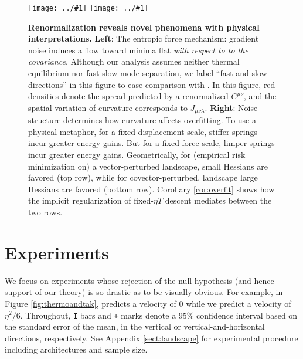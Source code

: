 \documentclass{article}
\theoremstyle{plain}
\theoremstyle{definition}
\newcommand{\plotmooh}[3]{\texttt{[image: ../\#1]}}
\begin{document}
        \begin{figure}[h!]
            \centering
            \plotmooh{diagrams/entropic-force-diagram}{}{0.32\columnwidth} 
            \plotmooh{diagrams/sharp}{}{0.31\columnwidth}
            \caption{
                {\bf Renormalization reveals novel phenomena
                with physical interpretations.}
                {\bf Left}:
                    The entropic force mechanism: gradient noise induces a flow
                    toward minima flat \emph{with respect to to the
                    covariance}.  Although our analysis assumes neither thermal
                    equilibrium nor fast-slow mode separation, we label ``fast
                    and slow directions'' in this figure to ease comparison
                    with \citet{we19b}.  In this figure, red densities denote
                    the spread predicted by a renormalized $C^{\mu\nu}$, and
                    the spatial variation of curvature corresponds to
                    $J_{\mu\nu\lambda}$. 
                {\bf Right}:
                    Noise structure determines how curvature affects
                    overfitting.  To use a physical metaphor, for a fixed
                    displacement scale, stiffer springs incur greater energy
                    gains.  But for a fixed force scale, limper springs incur
                    greater energy gains.  Geometrically, for (empirical risk
                    minimization on) a vector-perturbed landscape, small
                    Hessians are favored (top row), while for
                    covector-perturbed, landscape large Hessians are favored
                    (bottom row).  Corollary \ref{cor:overfit} shows how the
                    implicit regularization of fixed-$\eta T$ descent mediates
                    between the two rows.
            }
            \label{fig:cubicandspring}
        \end{figure}


\section{Experiments}

    We focus on experiments whose rejection of the null hypothesis (and hence
    support of our theory) is so drastic as to be visually obvious.  For
    example, in Figure \ref{fig:thermoandtak}, \citep{ch18} predicts a velocity
    of $0$ while we predict a velocity of $\eta^2/6$.  
    Throughout, \texttt{I} bars and \texttt{+} marks denote a 95\% confidence
    interval based on the standard error of the mean, in the vertical or
    vertical-and-horizontal directions, respectively.  See Appendix
    \ref{sect:landscape} for experimental procedure including architectures and
    sample size.
\end{document}

